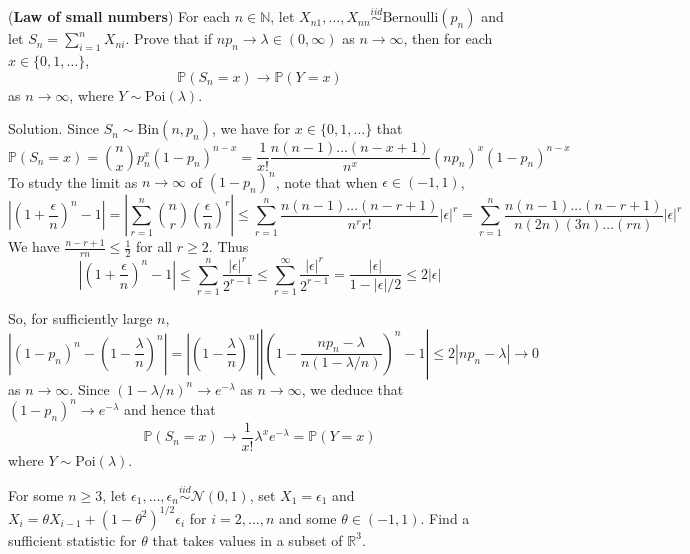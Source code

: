 \item ({\bf Law of small numbers}) For each $n\in\mathbb{N}$, let $X_{n1},\dots,X_{nn}\stackrel{iid}{\sim}\text{Bernoulli}(p_n)$ and let $S_n=\sum^n_{i=1}X_{ni}$. Prove that if $np_n\to\lambda\in(0,\infty)$ as $n\to\infty$, then for each $x\in\{0,1,\dots\}$,
\begin{equation}
\mathbb{P}(S_n=x)\to\mathbb{P}(Y=x)
\end{equation}
as $n\to\infty$, where $Y\sim\text{Poi}(\lambda)$.



Solution. Since $S_n\sim\text{Bin}(n,p_n)$, we have for $x\in\{0,1,\dots\}$ that
\begin{equation}
\mathbb{P}(S_n=x)=\binom{n}{x}p_n^x(1-p_n)^{n-x} = \frac{1}{x!}\frac{n(n-1)\dots(n-x+1)}{n^x}(np_n)^x(1-p_n)^{n-x}
\end{equation}
To study the limit as $n\to \infty$ of $(1-p_n)^n$, note that when $\epsilon\in(-1,1)$,
\begin{equation}
\left|\left(1+\frac{\epsilon}{n}\right)^n-1\right| = \left|\sum^n_{r=1}\binom{n}{r}\left(\frac{\epsilon}{n}\right)^r\right| \leq \sum^n_{r=1}\frac{n(n-1)\dots(n-r+1)}{n^rr!}|\epsilon|^r = \sum^n_{r=1}\frac{n(n-1)\dots(n-r+1)}{n(2n)(3n)\dots(rn)}|\epsilon|^r
\end{equation}
We have $\frac{n-r+1}{rn}\leq \frac 12$ for all $r\geq 2$. Thus
\begin{equation}
\left|\left(1+\frac{\epsilon}{n}\right)^n-1\right| \leq \sum^n_{r=1}\frac{|\epsilon|^r}{2^{r-1}}\leq \sum^\infty_{r=1}\frac{|\epsilon|^r}{2^{r-1}} = \frac{|\epsilon|}{1-|\epsilon|/2}\leq 2|\epsilon|
\end{equation}

So, for sufficiently large $n$,
\begin{equation}
\left|(1-p_n)^n-\left(1-\frac{\lambda}{n}\right)^n\right| = \left|\left(1-\frac{\lambda}{n}\right)^n\right| \left|\left(1-\frac{np_n-\lambda}{n(1-\lambda/n)}\right)^n-1\right| \leq 2|np_n-\lambda|\to 0
\end{equation}
as $n\to\infty$. Since $(1-\lambda/n)^n\to e^{-\lambda}$ as $n\to\infty$, we deduce that $(1-p_n)^n\to e^{-\lambda}$ and hence that
\begin{equation}
\mathbb{P}(S_n=x)\to \frac{1}{x!}\lambda^xe^{-\lambda} = \mathbb{P}(Y=x)
\end{equation}
where $Y\sim\text{Poi}(\lambda)$.





\item For some $n\geq 3$, let $\epsilon_1,\dots,\epsilon_n\stackrel{iid}{\sim}\mathcal{N}(0,1)$, set $X_1=\epsilon_1$ and $X_i=\theta X_{i-1}+(1-\theta^2)^{1/2}\epsilon_i$ for $i=2,\dots,n$ and some $\theta\in(-1,1)$. Find a sufficient statistic for $\theta$ that takes values in a subset of $\mathbb{R}^3$.



